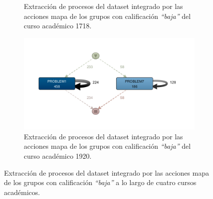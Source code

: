 \begin{figure}[H]
\begin{subfigure}[t]{0.60\textwidth}
    \caption{Extracción de procesos del dataset integrado por las acciones mapa de los grupos con calificación \emph{``baja''} del curso académico 1718.}
    \label{fig:mapYear1718WorstGrades}
  \end{subfigure}
  \hfill
  \begin{subfigure}[t]{0.60\textwidth}
    \includegraphics[width=1.10\textwidth, height=0.80\textwidth]{imagenes/DISCO_map/Dataset FusionadoYear1920WorstGrades.png}
    \caption{Extracción de procesos del dataset integrado por las acciones mapa de los grupos con calificación \emph{``baja''} del curso académico 1920.}
    \label{fig:mapYear1920WorstGrades}
  \end{subfigure}
  \caption{Extracción de procesos del dataset integrado por las acciones mapa de los grupos con calificación \emph{``baja''} a lo largo de cuatro cursos académicos.}
\end{figure}

